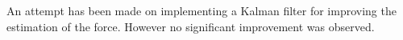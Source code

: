 An attempt has been made on implementing a Kalman filter for improving the estimation of the force. However no significant improvement was observed.







